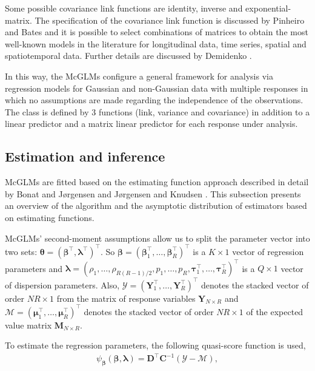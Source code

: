 \documentclass[USenglish]{article}
\theoremstyle{dgthm}
\theoremstyle{dgdef}
\begin{document}
Some possible covariance link functions are identity, inverse and exponential-matrix. The specification of the covariance link function is discussed by Pinheiro and Bates \cite{Pinheiro96} and it is possible to select combinations of matrices to obtain the most well-known models in the literature for longitudinal data, time series, spatial and spatiotemporal data. Further details are discussed by Demidenko \cite{Demidenko13}.

In this way, the McGLMs configure a general framework for analysis via regression models for Gaussian and non-Gaussian data with multiple responses in which no assumptions are made regarding the independence of the observations. The class is defined by 3 functions (link, variance and covariance) in addition to a linear predictor and a matrix linear predictor for each response under analysis.

\subsection{Estimation and inference}

McGLMs are fitted based on the estimating function approach described in detail by Bonat and Jørgensen \cite{Bonat16} and Jørgensen and Knudsen \cite{jorg04}. This subsection presents an overview of the algorithm and the asymptotic distribution of estimators based on estimating functions.

McGLMs' second-moment assumptions allow us to split the parameter vector into two sets: $\boldsymbol{\theta} = (\boldsymbol{\beta}^{\top}, \boldsymbol{\lambda}^{\top})^ {\top}$. So $\boldsymbol{\beta} = (\boldsymbol{\beta}_1^\top, \ldots, \boldsymbol{\beta}_R^\top)^\top$ is a $K \times 1$ vector of regression parameters and $\boldsymbol{\lambda} = (\rho_1, \ldots, \rho_{R(R-1)/2}, p_1, \ldots, p_R, \boldsymbol{\tau}_1^\top , \ldots, \boldsymbol{\tau}_R^\top)^\top$ is a $Q \times 1$ vector of dispersion parameters. Also, $\mathcal{Y} = (\boldsymbol{Y}_1^\top, \ldots, \boldsymbol{Y}_R^\top)^\top$ denotes the stacked vector of order $NR \times 1$ from the matrix of response variables $\boldsymbol{Y}_{N \times R}$ and $\mathcal{M} = (\boldsymbol{\mu}_1^\top, \ldots, \boldsymbol{\mu}_R^ \top)^\top$ denotes the stacked vector of order $NR \times 1$ of the expected value matrix $\boldsymbol{M}_{N \times R}$.

To estimate the regression parameters, the following quasi-score function \cite{Liang86} is used, 
$$
\begin{aligned}
  \psi_{\boldsymbol{\beta}}(\boldsymbol{\beta},
  \boldsymbol{\lambda}) = \boldsymbol{D}^\top
  \boldsymbol{C}^{-1}(\mathcal{Y} - \mathcal{M}),
\end{aligned}
$$
\end{document}
